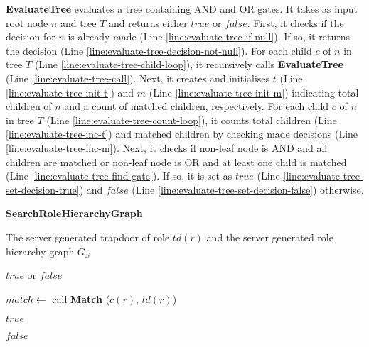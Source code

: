 \documentclass[final,5p,times,twocolumn]{elsarticle}
\newcommand{\algofontsize}{\fontsize{7}{8}\selectfont}
\begin{document}
\textbf{EvaluateTree} evaluates a tree containing AND and OR gates. It takes as input root node $n$ and tree $T$ and returns either $\mathit{true}$ or $\mathit{false}$. First, it checks if the decision for $n$ is already made (Line \ref{line:evaluate-tree-if-null}). If so, it returns the decision (Line \ref{line:evaluate-tree-decision-not-null}). For each child $c$ of $n$ in tree $T$ (Line \ref{line:evaluate-tree-child-loop}), it recursively calls \textbf{EvaluateTree} (Line \ref{line:evaluate-tree-call}). Next, it creates and initialises $t$ (Line \ref{line:evaluate-tree-init-t}) and $m$ (Line \ref{line:evaluate-tree-init-m}) indicating total children of $n$ and a count of matched children, respectively. For each child $c$ of $n$ in tree $T$ (Line \ref{line:evaluate-tree-count-loop}), it counts total children (Line \ref{line:evaluate-tree-inc-t}) and matched children by checking made decisions (Line \ref{line:evaluate-tree-inc-m}). Next, it checks if non-leaf node is AND and all children are matched or non-leaf node is OR and at least one child is matched (Line \ref{line:evaluate-tree-find-gate}). If so, it is set as $\mathit{true}$ (Line \ref{line:evaluate-tree-set-decision-true}) and $\mathit{false}$ (Line \ref{line:evaluate-tree-set-decision-false}) otherwise.






\begin{algorithm}[htp]
{\algofontsize
\caption{\textbf{SearchRoleHierarchyGraph}}

\label{algo:search-role-hierarchy-graph}

\begin{algorithmic}[1]

\REQUIRE The server generated trapdoor of role $td(r)$ and the server generated role hierarchy graph $G_{S}$

\ENSURE $\mathit{true}$ or $\mathit{false}$

\medskip

 \label{line:search-rh-loop}

	\STATE $match \leftarrow$ call \textbf{Match} ($c(r)$, $td(r)$) \label{line:search-rh-call}

	 \label{line:search-rh-match}
		\RETURN $\mathit{true}$ \label{line:search-rh-true}
	\ENDIF

\ENDFOR

\RETURN $\mathit{false}$ \label{line:search-rh-false}

\end{algorithmic}
}
\end{algorithm}
\end{document}
